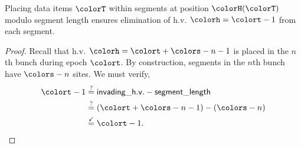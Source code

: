 \begin{lemma}[Placements Overwrite Hanoi Value $\colorh = \colort - 1$]
Placing data items $\colorT$ within segments at position $\colorH(\colorT)$ modulo segment length ensures elimination of h.v. $\colorh = \colort - 1$ from each segment.
\end{lemma} \label{thm:steady-hv-elimination}
\begin{proof}
Recall that h.v. $\colorh = \colort + \colors - n - 1$ is placed in the $n$th bunch during epoch $\colort$.
By construction, segments in the $n$th bunch have $\colors - n$ sites.
We must verify,
\begin{align*}
\colort - 1
&\stackrel{?}{=}
\mathsf{invading\_h.v.} - \mathsf{segment\_length}\\
&\stackrel{?}{=}
(\colort + \colors - n - 1) - (\colors - n)
 \\
&\stackrel{\checkmark}{=} \colort - 1.
\end{align*}
\end{proof}

